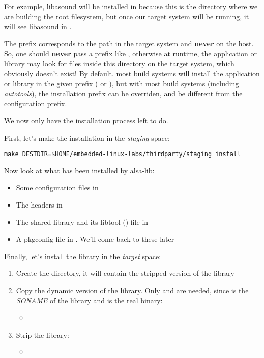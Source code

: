 For example, libasound will be installed in
 because this is
the directory where we are building the root filesystem, but once our
target system will be running, it will see libasound in
.

The prefix corresponds to the path in the target system and {\bf
  never} on the host. So, one should {\bf never} pass a prefix like
, otherwise at
runtime, the application or library may look for files inside this
directory on the target system, which obviously doesn't exist! By
default, most build systems will install the application or library in
the given prefix ( or ), but with most
build systems (including {\em autotools}), the installation prefix can
be overriden, and be different from the configuration prefix.

We now only have the installation process left to do.

First, let's make the installation in the {\em staging} space:
\begin{verbatim}
make DESTDIR=$HOME/embedded-linux-labs/thirdparty/staging install
\end{verbatim}

Now look at what has been installed by alsa-lib:
\begin{itemize}
\item Some configuration files in 
\item The headers in 
\item The shared library and its libtool () file in 
\item A pkgconfig file in . We'll come back
  to these later
\end{itemize}

Finally, let's install the library in the {\em target} space:

\begin{enumerate}
\item Create the  directory, it will contain the
  stripped version of the library
\item Copy the dynamic version of the library. Only
   and  are needed,
  since  is the {\em SONAME} of the library and
   is the real binary:
  \begin{itemize}
  \item {}
  \end{itemize}
\item Strip the library:
  \begin{itemize}
  \item {}
  \end{itemize}
\end{enumerate}

